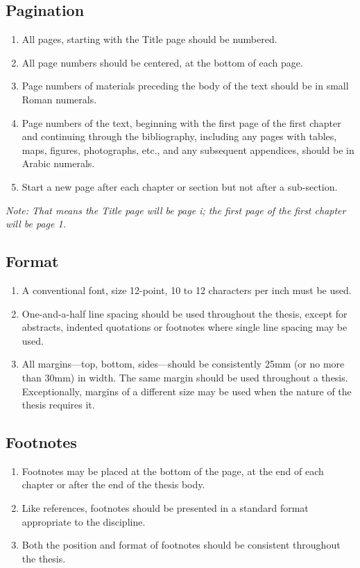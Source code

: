 \subsection{Pagination}

\begin{enumerate}
  \item All pages, starting with the Title page should be numbered.
  \item All page numbers should be centered, at the bottom of each page.
  \item Page numbers of materials preceding the body of the text should be in small Roman numerals.
  \item Page numbers of the text, beginning with the first page of the first chapter and continuing through the bibliography, including any pages with tables, maps, figures, photographs, etc., and any subsequent appendices, should be in Arabic numerals.
  \item Start a new page after each chapter or section but not after a sub-section.
\end{enumerate}

\emph{Note: That means the Title page will be page i; the first page of the first chapter will be page 1.}

\subsection{Format}

\begin{enumerate}
  \item A conventional font, size 12-point, 10 to 12 characters per inch must be used.
  \item One-and-a-half line spacing should be used throughout the thesis, except for abstracts, indented quotations or footnotes where single line spacing may be used.
  \item All margins—top, bottom, sides—should be consistently 25mm (or no more than 30mm) in width. The same margin should be used throughout a thesis. Exceptionally, margins of a different size may be used when the nature of the thesis requires it.
\end{enumerate}

\subsection{Footnotes}

\begin{enumerate}
  \item Footnotes may be placed at the bottom of the page, at the end of each chapter or after the end of the thesis body.
  \item Like references, footnotes should be presented in a standard format appropriate to the discipline.
  \item Both the position and format of footnotes should be consistent throughout the thesis.
\end{enumerate}

